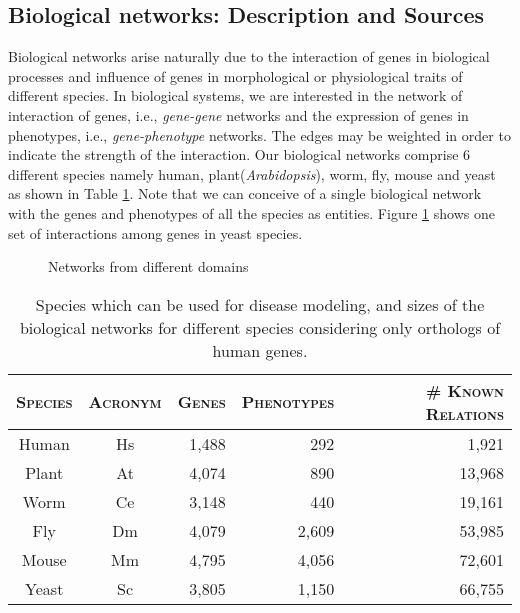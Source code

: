 \subsection{Biological networks: Description and Sources}
\label{section:dataset}
Biological networks arise naturally due to the interaction of genes in biological processes and influence of genes in morphological or physiological traits of different species. In biological systems, we are interested in the network of interaction of genes, i.e., \emph{gene-gene} networks and the expression of genes in phenotypes, i.e., \emph{gene-phenotype} networks. The edges may be weighted in order to indicate the strength of the interaction. Our biological networks comprise 6 different species namely human, plant(\emph{Arabidopsis}), worm, fly, mouse and yeast as shown in Table \ref{tab:data}. Note that we can conceive of a single biological network with the genes and phenotypes of all the species as entities. Figure \ref{fig:yeast} shows one set of interactions among genes in yeast species\cite{pmid15567862}.
\begin{figure}[ht]
  \begin{center}
  \end{center}
\vspace{-5ex}
\caption{Networks from different domains}
\label{fig:yeast}
\end{figure}

\begin{table}[ht]
\centering
\begin{tabular}{| c | c | r | r | r |} \hline
\textsc{Species} & \textsc{Acronym} & \textsc{Genes} & \textsc{Phenotypes} & \textsc{\# Known Relations} \\ \hline
Human & Hs & 1,488 & 292 & 1,921\\ \hline
Plant & At & 4,074 & 890 & 13,968\\ \hline
Worm & Ce & 3,148 & 440 & 19,161\\ \hline
Fly  & Dm & 4,079 & 2,609 & 53,985\\ \hline
Mouse & Mm & 4,795 & 4,056 & 72,601\\ \hline
Yeast & Sc & 3,805 & 1,150 & 66,755\\ \hline
\end{tabular}
\caption{Species which can be used for disease modeling, and sizes of the biological networks for different species considering only orthologs of human genes.}
\label{tab:data}
\end{table}

